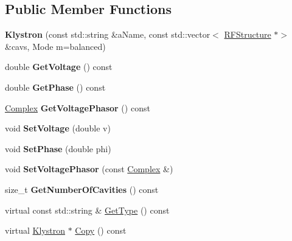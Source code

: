 \subsection*{Public Member Functions}
\begin{DoxyCompactItemize}
\item 
\mbox{\label{classKlystron_acaf5e3857ea7e108837baa9b84971f27}} 
{\bfseries Klystron} (const std\+::string \&a\+Name, const std\+::vector$<$ \hyperlink{classRFStructure}{R\+F\+Structure} $\ast$$>$ \&cavs, Mode m=balanced)
\item 
\mbox{\label{classKlystron_ac4082acd4a409eabfe8abd389bf88b39}} 
double {\bfseries Get\+Voltage} () const
\item 
\mbox{\label{classKlystron_a1c67ed0f04a1c3f5bafc38e58300cabe}} 
double {\bfseries Get\+Phase} () const
\item 
\mbox{\label{classKlystron_aaebe3c3ef31d610ef0039a89dedea4d3}} 
\hyperlink{classComplex}{Complex} {\bfseries Get\+Voltage\+Phasor} () const
\item 
\mbox{\label{classKlystron_a0a634244d8b903845dd9419d71b63950}} 
void {\bfseries Set\+Voltage} (double v)
\item 
\mbox{\label{classKlystron_a2f2f40f8878361f389d86494ecaa090d}} 
void {\bfseries Set\+Phase} (double phi)
\item 
\mbox{\label{classKlystron_a99f21505a2e21716cc9bc45d0740f67f}} 
void {\bfseries Set\+Voltage\+Phasor} (const \hyperlink{classComplex}{Complex} \&)
\item 
\mbox{\label{classKlystron_ab74307b431b48c0a85d16373b39a4a91}} 
size\+\_\+t {\bfseries Get\+Number\+Of\+Cavities} () const
\item 
virtual const std\+::string \& \hyperlink{classKlystron_a77d772abd8172d0de103bd14c838f6fc}{Get\+Type} () const
\item 
virtual \hyperlink{classKlystron}{Klystron} $\ast$ \hyperlink{classKlystron_a2cb5bf0328cf1f47d0d7bff0a0b55f16}{Copy} () const
\end{DoxyCompactItemize}
